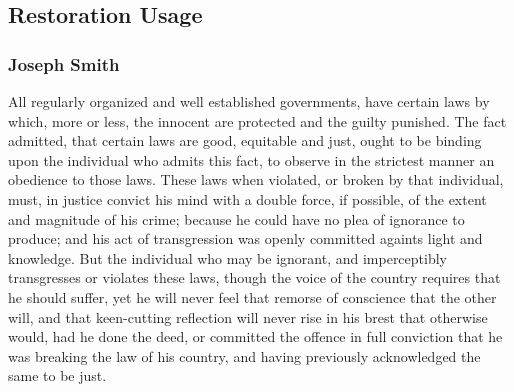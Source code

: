 
\subsection{Restoration Usage} %
	\label{REMORSE-RESTORATION}

	\subsubsection{Joseph Smith} %
		\label{REMORSE-JS}
	
		\begin{compactdesc}
			\item[{\hyperref[EMS-1834-JS-CIR-FEB-1834]{Letter to the Church, circa February 1834}}] All regularly organized and well established governments, have certain laws by which, more or less, the innocent are protected and the guilty punished. The fact admitted, that certain laws are good, equitable and just, ought to be binding upon the individual who admits this fact, to observe in the strictest manner an obedience to those laws. These laws when violated, or broken by that individual, must, in justice convict his mind with a double force, if possible, of the extent and magnitude of his crime; because he could have no plea of ignorance to produce; and his act of transgression was openly committed againts light and knowledge. But the individual who may be ignorant, and imperceptibly transgresses or violates these laws, though the voice of the country requires that he should suffer, yet he will never feel that remorse of conscience that the other will, and that keen-cutting reflection will never rise in his brest that otherwise would, had he done the deed, or committed the offence in full conviction that he was breaking the law of his country, and having previously acknowledged the same to be just.
		\end{compactdesc}
	
	
